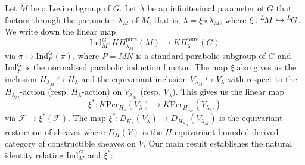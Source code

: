 \documentclass[11pt,letterpaper]{amsart}
\newcommand{\Lgroup}[1]{{\hskip-2 pt \,^L\hskip-1pt{#1}}}
\newcommand{\pure}{\mathrm{pure}}
\newcommand{\Ind}{\mathrm{Ind}}
\newcommand{\Per}{\mathrm{Per}}
\renewcommand{\1}{\mathbbm{1}}
\numberwithin{equation}{section}
\begin{document}
Let $M$ be a Levi subgroup of $G$. Let $\lambda$ be an infinitesimal parameter of $G$ that factors through the parameter $\lambda_M$ of $M$, that is, $\lambda=\xi\circ\lambda_M$, where $\xi:\Lgroup{M}\hookrightarrow \Lgroup{G}$. We write down the linear map 
\[\Ind_M^G:K\Pi^\pure_{\lambda_M}(M)\to K\Pi^\pure_{\lambda}(G)\] 
via $\pi \mapsto \Ind_P^G(\pi)$, where $P=MN$ is a standard parabolic subgroup of $G$ and $\Ind_P^G$ is the normalised parabolic induction functor. The map $\xi$ also gives us the inclusion $H_{\lambda_M} \hookrightarrow H_\lambda$ and the equivariant inclusion $V_{\lambda_M} \hookrightarrow V_\lambda$ with respect to the $H_{\lambda_M}$-action (resp. $H_\lambda$-action) on $V_{\lambda_M}$ (resp. $V_\lambda$). This gives us the linear map
\[\xi^*: K\Per_{H_\lambda}(V_\lambda) \to K\Per_{H_{\lambda_M}}(V_{\lambda_M})\]
via $\mathcal{F} \mapsto \xi^*(\mathcal{F})$. The map $\xi^*:D_{H_\lambda}(V_\lambda) \to D_{H_{\lambda_M}}(V_{\lambda_M})$ is the equivariant restriction of sheaves where $D_H(V)$ is the 
$H$-equivariant bounded derived category of constructible sheaves on $V$.
Our main result establishes the natural identity relating $\Ind_M^G$ and $\xi^*$:
\end{document}
